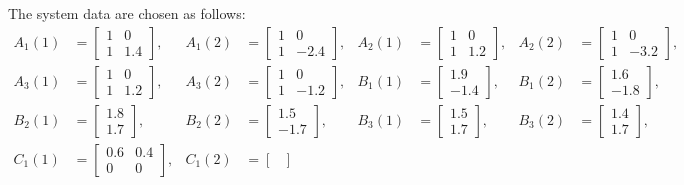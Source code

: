 \documentclass[11pt,draftcls,onecolumn]{IEEEtran}
\begin{document}
The system data  are chosen as follows:
\begin{align*}
 A_1(1)&=
\begin{bmatrix}
1 & 0\\
1 & 1.4
\end{bmatrix},
 &A_1(2)&=
\begin{bmatrix}
1 & 0\\
1 & -2.4
\end{bmatrix},
& A_2(1)&=
\begin{bmatrix}
1 & 0\\
1 & 1.2
\end{bmatrix},
  &A_2(2)&=
\begin{bmatrix}
1 & 0\\
1 & -3.2
\end{bmatrix},\\
 A_3(1)&=
\begin{bmatrix}
1 & 0\\
1 & 1.2
\end{bmatrix},
& A_3(2)&=\begin{bmatrix}
1 & 0\\
1 & -1.2
\end{bmatrix},
& B_1(1)&=\begin{bmatrix}
 1.9\\
 -1.4
 \end{bmatrix},
  & B_1(2)&=\begin{bmatrix}
  1.6\\
  -1.8\end{bmatrix},\\
B_2(1)&=
 \begin{bmatrix}
 1.8\\
 1.7\end{bmatrix},
  &B_2(2)&=
  \begin{bmatrix}
  1.5\\
  -1.7
  \end{bmatrix},
& B_3(1)&=
 \begin{bmatrix}
 1.5\\
 1.7
 \end{bmatrix},
    &  B_3(2)&=
    \begin{bmatrix}
    1.4\\
    1.7
    \end{bmatrix},\\
 C_1(1)&=
 \begin{bmatrix}
 0.6 & 0.4\\
 0& 0
 \end{bmatrix},
 & C_1(2)&=
 \begin{bmatrix}

\end{bmatrix}
\end{align*}
\end{document}
